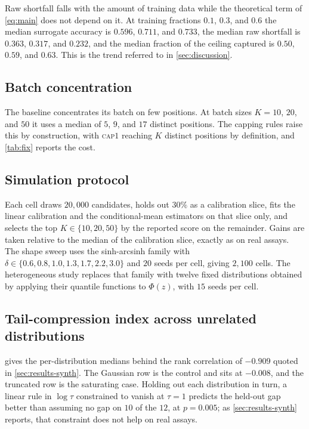 \documentclass{article}
\theoremstyle{plain}
\theoremstyle{definition}
\begin{document}
Raw shortfall falls with the amount of training data while the theoretical term of
\cref{eq:main} does not depend on it. At training fractions $0.1$, $0.3$, and $0.6$ the
median surrogate accuracy is $0.596$, $0.711$, and $0.733$, the median raw shortfall is
$0.363$, $0.317$, and $0.232$, and the median fraction of the ceiling captured is
$0.50$, $0.59$, and $0.63$. This is the trend referred to in \cref{sec:discussion}.

\subsection{Batch concentration}
\label{app:concentration}

The baseline concentrates its batch on few positions. At batch sizes $K = 10$, $20$,
and $50$ it uses a median of $5$, $9$, and $17$ distinct positions. The capping rules
raise this by construction, with \textsc{cap}$1$ reaching $K$ distinct positions by
definition, and \cref{tab:fix} reports the cost.

\subsection{Simulation protocol}
\label{app:sim-protocol}

Each cell draws $20{,}000$ candidates, holds out $30\%$ as a calibration slice, fits
the linear calibration and the conditional-mean estimators on that slice only, and
selects the top $K \in \{10, 20, 50\}$ by the reported score on the remainder. Gains
are taken relative to the median of the calibration slice, exactly as on real assays.
The shape sweep uses the sinh-arcsinh family with $\delta \in \{0.6, 0.8, 1.0, 1.3,
1.7, 2.2, 3.0\}$ and $20$ seeds per cell, giving $2{,}100$ cells. The heterogeneous
study replaces that family with twelve fixed distributions obtained by applying their
quantile functions to $\Phi(z)$, with $15$ seeds per cell.

\subsection{Tail-compression index across unrelated distributions}
\label{app:shapes}

 gives the per-distribution medians behind the rank correlation of
$-0.909$ quoted in \cref{sec:results-synth}. The Gaussian row is the control and sits
at $-0.008$, and the truncated row is the saturating case. Holding out each distribution
in turn, a linear rule in $\log \tau$ constrained to vanish at $\tau = 1$ predicts the
held-out gap better than assuming no gap on $10$ of the $12$, at $p = 0.005$; as
\cref{sec:results-synth} reports, that constraint does not help on real assays.
\end{document}
